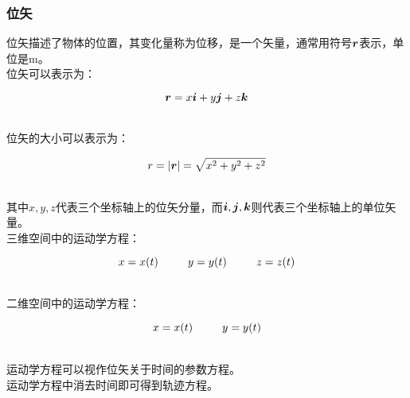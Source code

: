 \documentclass[UTF8]{ctexart}
\newcommand*{\veb}[1]{\vb*{#1}}
\begin{document}
\subsubsection{位矢}
    位矢描述了物体的位置，其变化量称为位移，是一个矢量，通常用符号$\veb{r}$表示，单位是\si{m}。\\[3mm]
    位矢可以表示为：
    \begin{large}
        \begin{equation*}
            \veb{r}=x\veb{i}+y\veb{j}+z\veb{k}\vspace{-5pt}
        \end{equation*}
    \end{large}\\
    位矢的大小可以表示为：
    \begin{large}
        \begin{equation*}
            r=|\veb{r}|=\sqrt{x^2+y^2+z^2}\vspace{-5pt}
        \end{equation*}
    \end{large}\\
    其中$x,y,z$代表三个坐标轴上的位矢分量，而$\veb{i},\veb{j},\veb{k}$则代表三个坐标轴上的单位矢量。\\[6mm]
    三维空间中的运动学方程：
    \begin{large}
        \begin{equation*}
            x=x(t)~~~~~~~~y=y(t)~~~~~~~~z=z(t)\vspace{-5pt}
        \end{equation*}
    \end{large}\\
    二维空间中的运动学方程：
    \begin{large}
        \begin{equation*}
            x=x(t)~~~~~~~~y=y(t)\vspace{-5pt}
        \end{equation*}
    \end{large}\\
    运动学方程可以视作位矢关于时间的参数方程。\\[3mm]
    运动学方程中消去时间即可得到轨迹方程。

\newpage
\end{document}
